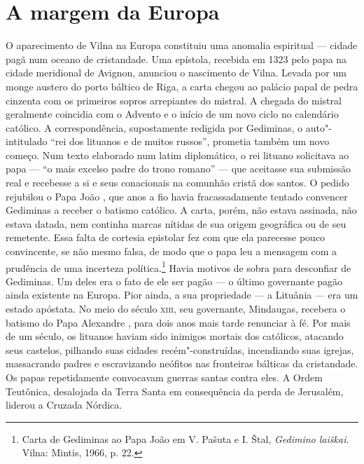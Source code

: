%

\chapter{A margem da Europa}

\begin{epigraphs} 
\end{epigraphs}

O aparecimento de Vilna na Europa constituiu uma anomalia espiritual ---
cidade pagã num oceano de cristandade. Uma epístola, recebida em 1323
pelo papa na cidade meridional de Avignon, anunciou o nascimento de
Vilna. Levada por um monge austero do porto báltico de Riga, a carta
chegou ao palácio papal de pedra cinzenta com os primeiros sopros
arrepiantes do mistral. A chegada do mistral geralmente coincidia com o
Advento e o início de um novo ciclo no calendário católico. A
correspondência, supostamente redigida por Gediminas, o auto"-intitulado
``rei dos lituanos e de muitos russos'', prometia também um novo começo.
Num texto elaborado num latim diplomático, o rei lituano solicitava ao
papa --- ``o mais excelso padre do trono romano'' --- que aceitasse sua
submissão real e recebesse a si e seus conacionais na comunhão cristã
dos santos. O pedido rejubilou o Papa João , que anos a fio havia
fracassadamente tentado convencer Gediminas a receber o batismo
católico. A carta, porém, não estava assinada, não estava datada, nem
continha marcas nítidas de sua origem geográfica ou de seu remetente.
Essa falta de cortesia epistolar fez com que ela parecesse pouco
convincente, se não mesmo falsa, de modo que o papa leu a mensagem com a
prudência de uma incerteza política.\footnote{Carta de Gediminas ao Papa João  em V. Pašuta e I. Štal, \textit{Gedimino laiškai}. Vilna: Mintis, 1966, p. 22.}
Havia motivos de sobra para desconfiar de Gediminas. Um deles era o fato
de ele ser pagão --- o último governante pagão ainda existente na Europa.
Pior ainda, a sua propriedade --- a Lituânia --- era um estado apóstata. No
meio do século \textsc{xiii}, seu governante, Mindaugas, recebera o batismo do Papa
Alexandre , para dois anos mais tarde renunciar à fé. Por mais de um
século, os lituanos haviam sido inimigos mortais dos católicos, atacando
seus castelos, pilhando suas cidades recém"-construídas, incendiando suas
igrejas, massacrando padres e escravizando neófitos nas fronteiras
bálticas da cristandade. Os papas repetidamente convocavam guerras
santas contra eles. A Ordem Teutônica, desalojada da Terra Santa em
consequência da perda de Jerusalém, liderou a Cruzada Nórdica.

